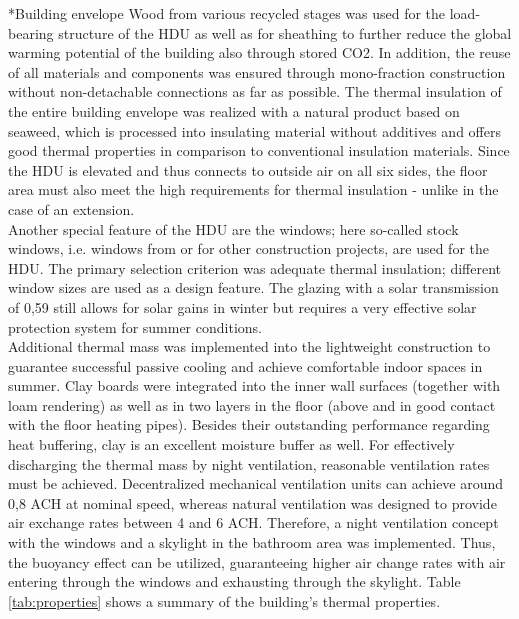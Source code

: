 \documentclass[twocolumn, a4paper,10pt]{article}
\makeatletter
\renewcommand\subsection{\@startsection{subsection}{1}{\z@}{\z@}{\z@}{\normalfont\normalsize\bfseries}}
\renewcommand\subsection{\@startsection{subsection}{1}{\z@}{\z@}{0.1pt}{\normalfont\normalsize\bfseries}}
\makeatother
\begin{document}
\subsection*{Building envelope}
Wood from various recycled stages was used for the load-bearing structure of the HDU as well as for sheathing to further reduce the global warming potential of the building also through stored CO2. In addition, the reuse of all materials and components was ensured through mono-fraction construction without non-detachable connections as far as possible. The thermal insulation of the entire building envelope was realized with a natural product based on seaweed, which is processed into insulating material without additives and offers good thermal properties in comparison to conventional insulation materials. Since the HDU is elevated and thus connects to outside air on all six sides, the floor area must also meet the high requirements for thermal insulation - unlike in the case of an extension.\\
Another special feature of the HDU are the windows; here so-called stock windows, i.e. windows from or for other construction projects, are used for the HDU. The primary selection criterion was adequate thermal insulation; different window sizes are used as a design feature. The glazing with a solar transmission of 0,59 still allows for solar gains in winter but requires a very effective solar protection system for summer conditions.\\
Additional thermal mass was implemented into the lightweight construction to guarantee successful passive cooling and achieve comfortable indoor spaces in summer. Clay boards were integrated into the inner wall surfaces (together with loam rendering) as well as in two layers in the floor (above and in good contact with the floor heating pipes). Besides their outstanding performance regarding heat buffering, clay is an excellent moisture buffer as well. For effectively discharging the thermal mass by night ventilation, reasonable ventilation rates must be achieved. Decentralized mechanical ventilation units can achieve around 0,8 ACH at nominal speed, whereas natural ventilation was designed to provide air exchange rates between 4 and 6 ACH. Therefore, a night ventilation concept with the windows and a skylight in the bathroom area was implemented. Thus, the buoyancy effect can be utilized, guaranteeing higher air change rates with air entering through the windows and exhausting through the skylight.  Table \ref{tab:properties} shows a summary of the building's thermal properties.\\
\end{document}
